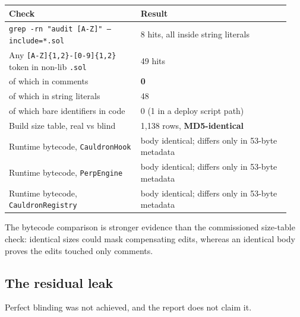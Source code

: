 \documentclass[11pt,a4paper]{article}
\newcommand{\code}[1]{\texttt{\small #1}}
\begin{document}
\begin{longtable}{@{}p{0.44\linewidth}p{0.5\linewidth}@{}}
\toprule
\textbf{Check} & \textbf{Result} \\
\midrule
\endhead
\code{grep -rn "audit [A-Z]" --include=*.sol} & 8 hits, all inside string literals \\
Any \code{[A-Z]\{1,2\}-[0-9]\{1,2\}} token in non-lib \code{.sol} & 49 hits \\
\quad of which in comments & \textbf{0} \\
\quad of which in string literals & 48 \\
\quad of which bare identifiers in code & 0 (1 in a deploy script path) \\
Build size table, real vs blind & 1{,}138 rows, \textbf{MD5-identical} \\
Runtime bytecode, \code{CauldronHook} & body identical; differs only in 53-byte metadata \\
Runtime bytecode, \code{PerpEngine} & body identical; differs only in 53-byte metadata \\
Runtime bytecode, \code{CauldronRegistry} & body identical; differs only in 53-byte metadata \\
\bottomrule
\end{longtable}

\noindent The bytecode comparison is stronger evidence than the commissioned size-table
check: identical sizes could mask compensating edits, whereas an identical body proves the
edits touched only comments.

\subsection{The residual leak}

Perfect blinding was not achieved, and the report does not claim it.
\end{document}
